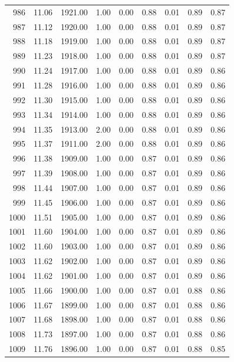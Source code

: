 \documentclass{article}\usepackage[]{graphicx}\usepackage[]{color}
\begin{document}
\begin{longtable}{rrrrrrrrr}
  986 & 11.06 & 1921.00 & 1.00 & 0.00 & 0.88 & 0.01 & 0.89 & 0.87 \\ 
  987 & 11.12 & 1920.00 & 1.00 & 0.00 & 0.88 & 0.01 & 0.89 & 0.87 \\ 
  988 & 11.18 & 1919.00 & 1.00 & 0.00 & 0.88 & 0.01 & 0.89 & 0.87 \\ 
  989 & 11.23 & 1918.00 & 1.00 & 0.00 & 0.88 & 0.01 & 0.89 & 0.87 \\ 
  990 & 11.24 & 1917.00 & 1.00 & 0.00 & 0.88 & 0.01 & 0.89 & 0.86 \\ 
  991 & 11.28 & 1916.00 & 1.00 & 0.00 & 0.88 & 0.01 & 0.89 & 0.86 \\ 
  992 & 11.30 & 1915.00 & 1.00 & 0.00 & 0.88 & 0.01 & 0.89 & 0.86 \\ 
  993 & 11.34 & 1914.00 & 1.00 & 0.00 & 0.88 & 0.01 & 0.89 & 0.86 \\ 
  994 & 11.35 & 1913.00 & 2.00 & 0.00 & 0.88 & 0.01 & 0.89 & 0.86 \\ 
  995 & 11.37 & 1911.00 & 2.00 & 0.00 & 0.88 & 0.01 & 0.89 & 0.86 \\ 
  996 & 11.38 & 1909.00 & 1.00 & 0.00 & 0.87 & 0.01 & 0.89 & 0.86 \\ 
  997 & 11.39 & 1908.00 & 1.00 & 0.00 & 0.87 & 0.01 & 0.89 & 0.86 \\ 
  998 & 11.44 & 1907.00 & 1.00 & 0.00 & 0.87 & 0.01 & 0.89 & 0.86 \\ 
  999 & 11.45 & 1906.00 & 1.00 & 0.00 & 0.87 & 0.01 & 0.89 & 0.86 \\ 
  1000 & 11.51 & 1905.00 & 1.00 & 0.00 & 0.87 & 0.01 & 0.89 & 0.86 \\ 
  1001 & 11.60 & 1904.00 & 1.00 & 0.00 & 0.87 & 0.01 & 0.89 & 0.86 \\ 
  1002 & 11.60 & 1903.00 & 1.00 & 0.00 & 0.87 & 0.01 & 0.89 & 0.86 \\ 
  1003 & 11.62 & 1902.00 & 1.00 & 0.00 & 0.87 & 0.01 & 0.89 & 0.86 \\ 
  1004 & 11.62 & 1901.00 & 1.00 & 0.00 & 0.87 & 0.01 & 0.89 & 0.86 \\ 
  1005 & 11.66 & 1900.00 & 1.00 & 0.00 & 0.87 & 0.01 & 0.88 & 0.86 \\ 
  1006 & 11.67 & 1899.00 & 1.00 & 0.00 & 0.87 & 0.01 & 0.88 & 0.86 \\ 
  1007 & 11.68 & 1898.00 & 1.00 & 0.00 & 0.87 & 0.01 & 0.88 & 0.86 \\ 
  1008 & 11.73 & 1897.00 & 1.00 & 0.00 & 0.87 & 0.01 & 0.88 & 0.86 \\ 
  1009 & 11.76 & 1896.00 & 1.00 & 0.00 & 0.87 & 0.01 & 0.88 & 0.85 \\ 

\end{longtable}
\end{document}
